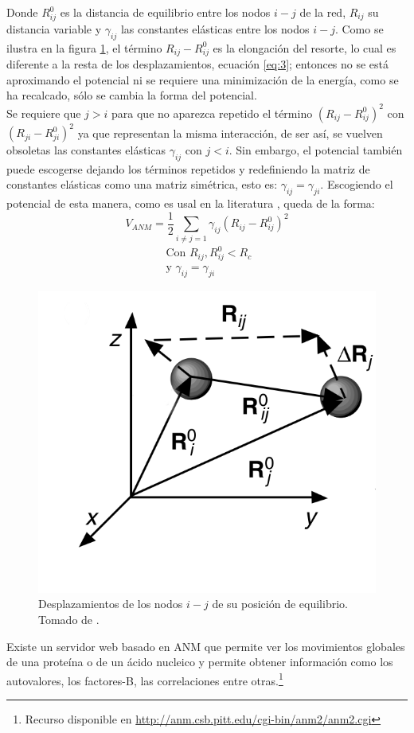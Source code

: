 Donde $R_{ij}^0$ es la distancia de equilibrio entre los nodos $i-j$ de la red, $R_{ij}$ su distancia variable y $\gamma_{ij}$ las constantes el\'{a}sticas entre los nodos $i-j$. Como se ilustra en la figura \ref{fig:res}, el t\'{e}rmino $R_{ij}-R_{ij}^0$ es la elongaci\'{o}n del resorte, lo cual es diferente a la resta de los desplazamientos, ecuaci\'{o}n \eqref{eq:3}; entonces no se est\'{a} aproximando el potencial ni se requiere una minimizaci\'{o}n de la energ\'{i}a, como se ha recalcado, s\'{o}lo se cambia la forma del potencial.\\

Se requiere que $j>i$ para que no aparezca repetido el t\'{e}rmino $\left(R_{ij}-R_{ij}^0\right)^2$ con $\left(R_{ji}-R_{ji}^0\right)^2$   ya que representan la misma interacci\'{o}n, de ser as\'{i}, se vuelven obsoletas las constantes el\'{a}sticas $\gamma_{ij}$ con $j<i$. Sin embargo, el potencial tambi\'{e}n puede escogerse dejando los t\'{e}rminos repetidos y redefiniendo la matriz de constantes el\'{a}sticas como una matriz sim\'{e}trica, esto es: $\gamma_{ij}=\gamma_{ji}$. Escogiendo el potencial de esta manera, como es usal en la literatura \cite{Rader2006}, queda de la forma:
\begin{equation}\label{eq:26}
V_{ANM}=
   \frac{1}{2}\sum_{
   i\neq j=1  
   }
   \gamma_{ij}\left(R_{ij}-R_{ij}^0\right)^2
\end{equation}
\begin{eqnarray*}
\mbox{			Con		} R_{ij},R_{ij}^0<R_c \\
\mbox{			y		} \gamma_{ij}=\gamma_{ji}
\end{eqnarray*}
\begin{figure}
\centering%
\includegraphics[scale=0.3]{Kap2/resorte.png}%
\caption{Desplazamientos de los nodos $i-j$ de su posici\'{o}n de equilibrio. Tomado de \cite{Rader2006}.} \label{fig:res}
\end{figure}
Existe un servidor web \cite{Eyal2015} basado en ANM que permite ver los movimientos globales de una prote\'{i}na o de un \'{a}cido nucleico y permite obtener informaci\'{o}n como los autovalores, los factores-B, las correlaciones entre otras.\footnote{ Recurso disponible en \url{http://anm.csb.pitt.edu/cgi-bin/anm2/anm2.cgi}}
